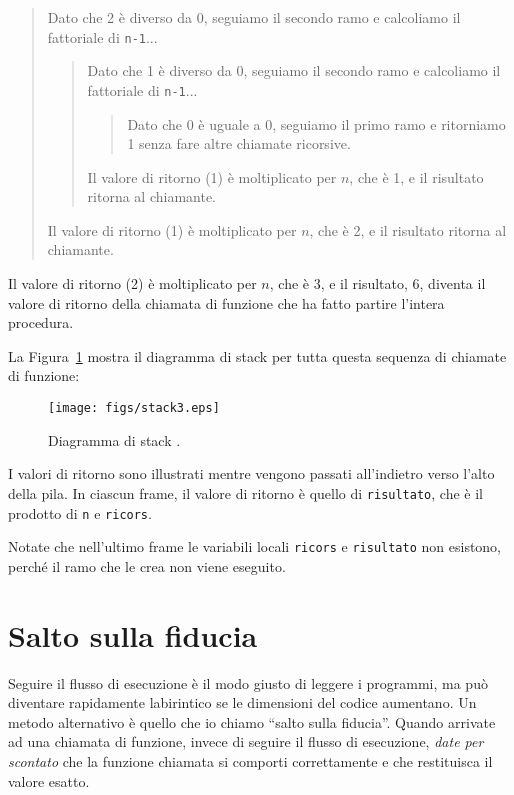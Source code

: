 \documentclass[10pt]{book}
\begin{document}
\begin{quote}
Dato che 2 è diverso da 0, seguiamo il secondo ramo e calcoliamo il fattoriale di {\tt n-1}...


  \begin{quote}
  Dato che 1 è diverso da 0, seguiamo il secondo ramo e calcoliamo il fattoriale di {\tt n-1}...


    \begin{quote}
    Dato che 0 è uguale a 0, seguiamo il primo ramo e ritorniamo 1 senza fare altre chiamate ricorsive.
    \end{quote}


  Il valore di ritorno (1) è moltiplicato per $n$, che è 1, e il risultato
     ritorna al chiamante.
  \end{quote}


Il valore di ritorno (1) è moltiplicato per $n$, che è 2, e il risultato
     ritorna al chiamante.
\end{quote}


Il valore di ritorno (2) è moltiplicato per $n$, che è 3, e il risultato, 6, diventa il valore di ritorno della chiamata di funzione che ha fatto partire l'intera procedura.

La Figura~\ref{fig.stack3} mostra il diagramma di stack per tutta questa sequenza di chiamate di funzione:

\begin{figure}
\centerline
{\texttt{[image: figs/stack3.eps]}}
\caption{Diagramma di stack .}
\label{fig.stack3}
\end{figure}

I valori di ritorno sono illustrati mentre vengono passati all'indietro verso l'alto della pila. In ciascun frame, il valore di ritorno è quello di {\tt risultato}, che è il prodotto di {\tt n} e {\tt ricors}.

Notate che nell'ultimo frame le variabili locali {\tt ricors} e {\tt risultato} non esistono, perché il ramo che le crea non viene eseguito.


\section{Salto sulla fiducia}

Seguire il flusso di esecuzione è il modo giusto di leggere i programmi, ma
può diventare rapidamente labirintico se le dimensioni del codice aumentano. Un metodo alternativo è quello che io chiamo ``salto sulla fiducia''.  Quando arrivate ad una chiamata di funzione, invece di seguire il flusso di esecuzione, {\em date per scontato} che la funzione chiamata si comporti correttamente e che restituisca il valore esatto.
\end{document}
